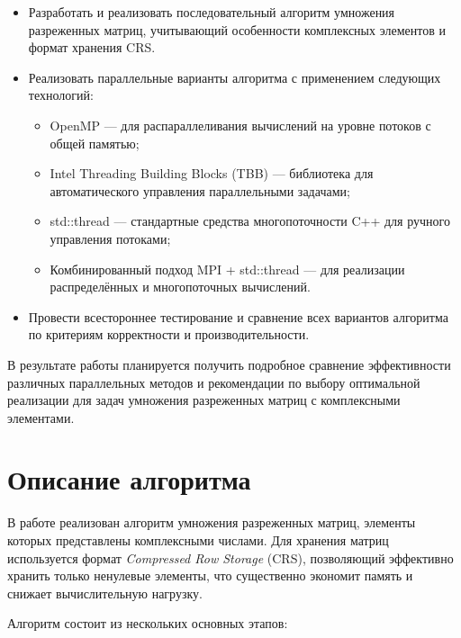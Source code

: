 \documentclass[a4paper,12pt]{article}
\begin{document}
\begin{itemize}
    \item Разработать и реализовать последовательный алгоритм умножения разреженных матриц, учитывающий особенности комплексных элементов и формат хранения CRS.
    
    \vspace{0.2cm}
    \item Реализовать параллельные варианты алгоритма с применением следующих технологий:
    \begin{itemize}
        \item OpenMP — для распараллеливания вычислений на уровне потоков с общей памятью;
        \item Intel Threading Building Blocks (TBB) — библиотека для автоматического управления параллельными задачами;
        \item std::thread — стандартные средства многопоточности C++ для ручного управления потоками;
        \item Комбинированный подход MPI + std::thread — для реализации распределённых и многопоточных вычислений.
    \end{itemize}
    
    \vspace{0.2cm}
    \item Провести всестороннее тестирование и сравнение всех вариантов алгоритма по критериям корректности и производительности.
\end{itemize}

\vspace{0.3cm}

В результате работы планируется получить подробное сравнение эффективности различных параллельных методов и рекомендации по выбору оптимальной реализации для задач умножения разреженных матриц с комплексными элементами.

\newpage

\section{Описание алгоритма}

В работе реализован алгоритм умножения разреженных матриц, элементы которых представлены комплексными числами. Для хранения матриц используется формат \textit{Compressed Row Storage} (CRS), позволяющий эффективно хранить только ненулевые элементы, что существенно экономит память и снижает вычислительную нагрузку.

Алгоритм состоит из нескольких основных этапов:
\end{document}
